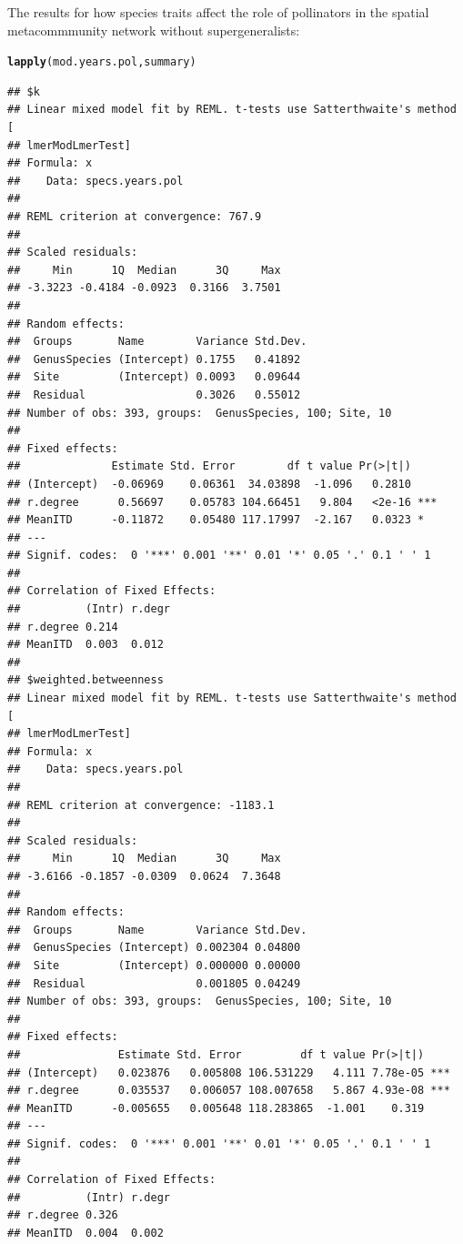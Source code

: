 \documentclass{article}\usepackage[]{graphicx}\usepackage[]{color}
\makeatletter
\newcommand{\hlstd}[1]{\textcolor[rgb]{0.345,0.345,0.345}{#1}}%
\newcommand{\hlkwd}[1]{\textcolor[rgb]{0.737,0.353,0.396}{\textbf{#1}}}%
\newenvironment{kframe}{%
 \def\at@end@of@kframe{}%
 \ifinner\ifhmode%
  \def\at@end@of@kframe{\end{minipage}}%
  \begin{minipage}{\columnwidth}%
 \fi\fi%
 \def\FrameCommand##1{\hskip\@totalleftmargin \hskip-\fboxsep
 \colorbox{shadecolor}{##1}\hskip-\fboxsep
     \hskip-\linewidth \hskip-\@totalleftmargin \hskip\columnwidth}%
 \MakeFramed {\advance\hsize-\width
   \@totalleftmargin\z@ \linewidth\hsize
   \@setminipage}}%
 {\par\unskip\endMakeFramed%
 \at@end@of@kframe}
\newenvironment{knitrout}{}{} %
\makeatother
\begin{document}
The results for how species traits affect the role of pollinators in
the spatial metacommmunity network without supergeneralists: 
\begin{knitrout}
\color{fgcolor}\begin{kframe}
\begin{alltt}
\hlkwd{lapply}\hlstd{(mod.years.pol, summary)}
\end{alltt}
\begin{verbatim}
## $k
## Linear mixed model fit by REML. t-tests use Satterthwaite's method [
## lmerModLmerTest]
## Formula: x
##    Data: specs.years.pol
## 
## REML criterion at convergence: 767.9
## 
## Scaled residuals: 
##     Min      1Q  Median      3Q     Max 
## -3.3223 -0.4184 -0.0923  0.3166  3.7501 
## 
## Random effects:
##  Groups       Name        Variance Std.Dev.
##  GenusSpecies (Intercept) 0.1755   0.41892 
##  Site         (Intercept) 0.0093   0.09644 
##  Residual                 0.3026   0.55012 
## Number of obs: 393, groups:  GenusSpecies, 100; Site, 10
## 
## Fixed effects:
##              Estimate Std. Error        df t value Pr(>|t|)    
## (Intercept)  -0.06969    0.06361  34.03898  -1.096   0.2810    
## r.degree      0.56697    0.05783 104.66451   9.804   <2e-16 ***
## MeanITD      -0.11872    0.05480 117.17997  -2.167   0.0323 *  
## ---
## Signif. codes:  0 '***' 0.001 '**' 0.01 '*' 0.05 '.' 0.1 ' ' 1
## 
## Correlation of Fixed Effects:
##          (Intr) r.degr
## r.degree 0.214        
## MeanITD  0.003  0.012 
## 
## $weighted.betweenness
## Linear mixed model fit by REML. t-tests use Satterthwaite's method [
## lmerModLmerTest]
## Formula: x
##    Data: specs.years.pol
## 
## REML criterion at convergence: -1183.1
## 
## Scaled residuals: 
##     Min      1Q  Median      3Q     Max 
## -3.6166 -0.1857 -0.0309  0.0624  7.3648 
## 
## Random effects:
##  Groups       Name        Variance Std.Dev.
##  GenusSpecies (Intercept) 0.002304 0.04800 
##  Site         (Intercept) 0.000000 0.00000 
##  Residual                 0.001805 0.04249 
## Number of obs: 393, groups:  GenusSpecies, 100; Site, 10
## 
## Fixed effects:
##               Estimate Std. Error         df t value Pr(>|t|)    
## (Intercept)   0.023876   0.005808 106.531229   4.111 7.78e-05 ***
## r.degree      0.035537   0.006057 108.007658   5.867 4.93e-08 ***
## MeanITD      -0.005655   0.005648 118.283865  -1.001    0.319    
## ---
## Signif. codes:  0 '***' 0.001 '**' 0.01 '*' 0.05 '.' 0.1 ' ' 1
## 
## Correlation of Fixed Effects:
##          (Intr) r.degr
## r.degree 0.326        
## MeanITD  0.004  0.002
\end{verbatim}
\end{kframe}
\end{knitrout}
\end{document}
